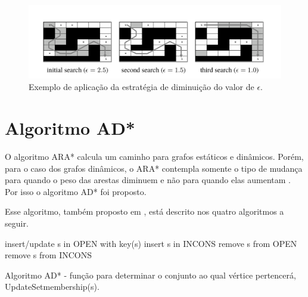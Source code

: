 \begin{figure}[H]
\centering
\includegraphics[width=.80\textwidth]{figuras/ara-3} 
\caption{Exemplo de aplicação da estratégia de diminuição do valor de $\epsilon$.}
\label{fig-ara-exemplo}
\end{figure}



\section{Algoritmo AD*}
\label{sec-dinamicos-ad}

O algoritmo ARA* calcula um caminho para grafos estáticos e dinâmicos. Porém, para o caso dos grafos dinâmicos, o ARA* contempla somente o tipo de mudança para quando o peso das arestas diminuem e não para quando elas aumentam \cite{moura2010estudo}. Por isso o algoritmo AD* foi proposto.

Esse algoritmo, também proposto em , está descrito nos quatro algoritmos a seguir.

\begin{algorithm}[H]
\SetAlgoLined
{
	{
		insert/update s in OPEN with key(s)\;
	}
	{
		{
			insert s in INCONS\;
		}
	}
}
{
	{
		remove s from OPEN\;
	}
	{
		{
			remove s from INCONS\;
		}
	}
}
\caption{Algoritmo AD* - função para determinar o conjunto ao qual vértice pertencerá, UpdateSetmembership(s).}
\end{algorithm}

